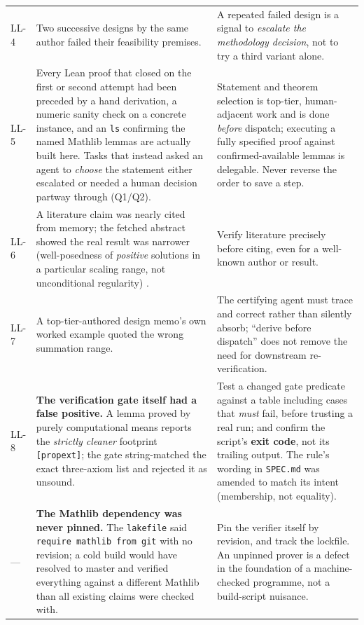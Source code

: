 \documentclass[11pt,a4paper]{article}
\theoremstyle{definition}
\theoremstyle{plain}
\begin{document}
\begin{longtable}{@{}p{1.1cm}p{6.3cm}p{7.0cm}@{}}
\addlinespace
LL-4 & Two successive designs by the same author failed their feasibility premises. & A repeated failed design is a signal to \emph{escalate the methodology decision}, not to try a third variant alone. \\
\addlinespace
LL-5 & Every Lean proof that closed on the first or second attempt had been preceded by a hand derivation, a numeric sanity check on a concrete instance, and an \texttt{ls} confirming the named Mathlib lemmas are actually built here. Tasks that instead asked an agent to \emph{choose} the statement either escalated or needed a human decision partway through (Q1/Q2). & Statement and theorem selection is top-tier, human-adjacent work and is done \emph{before} dispatch; executing a fully specified proof against confirmed-available lemmas is delegable. Never reverse the order to save a step. \\
\addlinespace
LL-6 & A literature claim was nearly cited from memory; the fetched abstract showed the real result was narrower (well-posedness of \emph{positive} solutions in a particular scaling range, not unconditional regularity) \cite{barbato-morandin-romito}. & Verify literature precisely before citing, even for a well-known author or result. \\
\addlinespace
LL-7 & A top-tier-authored design memo's own worked example quoted the wrong summation range. & The certifying agent must trace and correct rather than silently absorb; ``derive before dispatch'' does not remove the need for downstream re-verification. \\
\addlinespace
LL-8 & \textbf{The verification gate itself had a false positive.} A lemma proved by purely computational means reports the \emph{strictly cleaner} footprint \texttt{[propext]}; the gate string-matched the exact three-axiom list and rejected it as unsound. & Test a changed gate predicate against a table including cases that \emph{must} fail, before trusting a real run; and confirm the script's \textbf{exit code}, not its trailing output. The rule's wording in \texttt{SPEC.md} was amended to match its intent (membership, not equality). \\
\addlinespace
--- & \textbf{The Mathlib dependency was never pinned.} The \texttt{lakefile} said \texttt{require mathlib from git} with no revision; a cold build would have resolved to master and verified everything against a different Mathlib than all existing claims were checked with. & Pin the verifier itself by revision, and track the lockfile. An unpinned prover is a defect in the foundation of a machine-checked programme, not a build-script nuisance. \\

\end{longtable}
\end{document}
